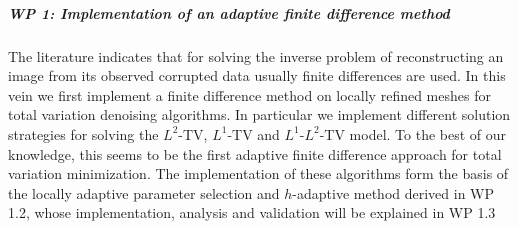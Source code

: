\documentclass[enabledeprecatedfontcommands,cleardoublepage=empty,headsepline,twoside,11pt,DIV=15,BCOR=12mm,final]{scrartcl}
\begin{document}


 
\subparagraph{WP 1: Implementation of an adaptive finite difference method}
 
 The literature indicates that for solving the inverse problem of reconstructing an image from its observed corrupted data usually finite differences are used. In this vein we first implement a finite difference method on locally refined meshes for total variation denoising algorithms. In particular we implement different solution strategies for solving the $L^2$-TV, $L^1$-TV and $L^1$-$L^2$-TV model. %
 To the best of our knowledge, this seems to be the first adaptive finite difference approach for total variation minimization. The implementation of these algorithms form the basis of the locally adaptive parameter selection and $h$-adaptive method derived in WP 1.2, whose implementation, analysis and validation will be explained in WP 1.3 
 
\end{document}
